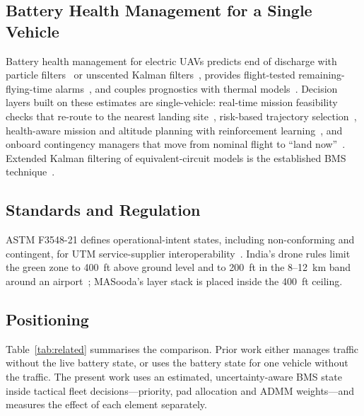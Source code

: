 \documentclass[journal]{IEEEtran}
\begin{document}
\subsection{Battery Health Management for a Single Vehicle}
Battery health management for electric UAVs predicts end of discharge with particle filters~\cite{saha2011bhm} or unscented Kalman filters~\cite{bole2014online}, provides flight-tested remaining-flying-time alarms~\cite{kulkarni2018remaining,hogge2024octocopter}, and couples prognostics with thermal models~\cite{kulkarni2024thermal}. Decision layers built on these estimates are single-vehicle: real-time mission feasibility checks that re-route to the nearest landing site~\cite{taye2025safe}, risk-based trajectory selection~\cite{quinones2020decision}, health-aware mission and altitude planning with reinforcement learning~\cite{montazeri2024health}, and onboard contingency managers that move from nominal flight to ``land now''~\cite{baculi2019onboard}. Extended Kalman filtering of equivalent-circuit models is the established BMS technique~\cite{plett2004ekf,plett2015bms}.

\subsection{Standards and Regulation}
ASTM F3548-21 defines operational-intent states, including non-conforming and contingent, for UTM service-supplier interoperability~\cite{astmF3548}. India's drone rules limit the green zone to 400~ft above ground level and to 200~ft in the 8--12~km band around an airport~\cite{pib2021drone}; MASooda's layer stack is placed inside the 400~ft ceiling.

\subsection{Positioning}
Table~\ref{tab:related} summarises the comparison. Prior work either manages traffic without the live battery state, or uses the battery state for one vehicle without the traffic. The present work uses an estimated, uncertainty-aware BMS state inside tactical fleet decisions---priority, pad allocation and ADMM weights---and measures the effect of each element separately.
\end{document}
